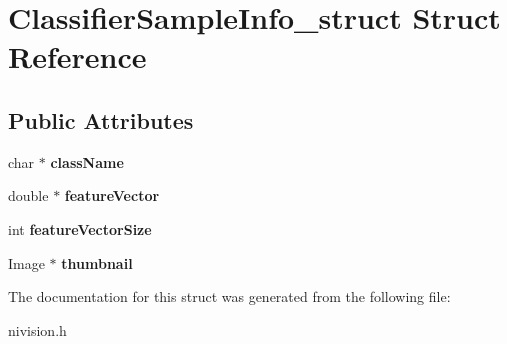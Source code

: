 \hypertarget{structClassifierSampleInfo__struct}{
\section{ClassifierSampleInfo\_\-struct Struct Reference}
\label{structClassifierSampleInfo__struct}
}
\subsection*{Public Attributes}
\begin{DoxyCompactItemize}
\item 
\hypertarget{structClassifierSampleInfo__struct_aa2a108aa12f570b0c96224f838e800fa}{
char $\ast$ {\bfseries className}}
\label{structClassifierSampleInfo__struct_aa2a108aa12f570b0c96224f838e800fa}

\item 
\hypertarget{structClassifierSampleInfo__struct_aa5d5583417632de57ee7e8adf16ecc1e}{
double $\ast$ {\bfseries featureVector}}
\label{structClassifierSampleInfo__struct_aa5d5583417632de57ee7e8adf16ecc1e}

\item 
\hypertarget{structClassifierSampleInfo__struct_ae9229bafe5e7bd33c32530033a37c231}{
int {\bfseries featureVectorSize}}
\label{structClassifierSampleInfo__struct_ae9229bafe5e7bd33c32530033a37c231}

\item 
\hypertarget{structClassifierSampleInfo__struct_adf380f770cb82b5fc67c3a51bc3797d9}{
Image $\ast$ {\bfseries thumbnail}}
\label{structClassifierSampleInfo__struct_adf380f770cb82b5fc67c3a51bc3797d9}

\end{DoxyCompactItemize}


The documentation for this struct was generated from the following file:\begin{DoxyCompactItemize}
\item 
nivision.h\end{DoxyCompactItemize}
